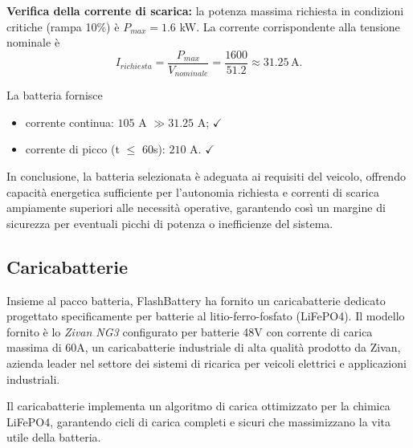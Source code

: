 \textbf{Verifica della corrente di scarica:}
la potenza massima richiesta in condizioni critiche (rampa 10\%) è $P_{max} = 1.6$ kW. La corrente corrispondente alla tensione nominale è
\begin{equation}
    I_{richiesta} = \frac{P_{max}}{V_{nominale}} = \frac{1600}{51.2} \approx 31.25 \, \text{A}.
\end{equation}

La batteria fornisce
\begin{itemize}
    \item corrente continua: $105$ A $\gg 31.25$ A; $\checkmark$
    \item corrente di picco (t $\leq$ 60s): $210$ A. $\checkmark$
\end{itemize}

In conclusione, la batteria selezionata è adeguata ai requisiti del veicolo, offrendo capacità energetica sufficiente per l'autonomia richiesta e correnti di scarica ampiamente superiori alle necessità operative, garantendo così un margine di sicurezza per eventuali picchi di potenza o inefficienze del sistema.

\subsection{Caricabatterie}
Insieme al pacco batteria, FlashBattery ha fornito un caricabatterie dedicato progettato specificamente per batterie al litio-ferro-fosfato (LiFePO4). Il modello fornito è lo \textit{Zivan NG3} configurato per batterie 48V con corrente di carica massima di 60A, un caricabatterie industriale di alta qualità prodotto da Zivan, azienda leader nel settore dei sistemi di ricarica per veicoli elettrici e applicazioni industriali.

Il caricabatterie implementa un algoritmo di carica ottimizzato per la chimica LiFePO4, garantendo cicli di carica completi e sicuri che massimizzano la vita utile della batteria.

